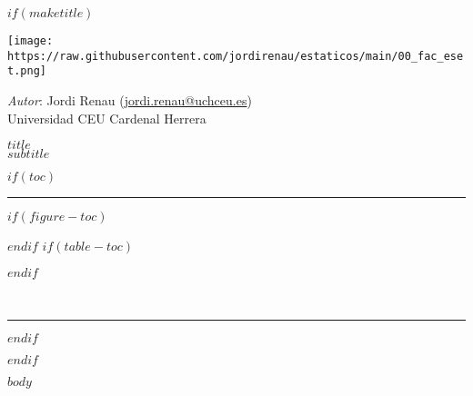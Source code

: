 \documentclass[11pt,a4paper,twoside,onecolumn,notitlepage,final]{scrartcl}
\date{$date$}
\newcommand{\mititulo}{ $title$ }
\newcommand{\misubtitulo}{ $subtitle$ }
\begin{document}
	\renewcommand{\tablename}{Tabla}
	
	$if(maketitle)$
	\begin{titlepage}
		
		\begin{minipage}[c]{0.29\textwidth}
	\texttt{[image: https://raw.githubusercontent.com/jordirenau/estaticos/main/00\_fac\_eset.png]}
	\end{minipage}
	\begin{minipage}[r]{0.7\textwidth}
		\begin{flushright}
			\large
			\textit{Autor}: Jordi Renau (\href{mailto:jordi.renau@uchceu.es}{jordi.renau@uchceu.es}) \\
			Universidad CEU Cardenal Herrera %
		\end{flushright}
		
	\end{minipage}
	
	\begin{flushright}
		\Huge 
		\mititulo \\[0.5cm]
		\huge
		\misubtitulo \\[1.5cm]
	\end{flushright}
	$if(toc)$
	\hrule
	\renewcommand{\contentsname}{Contenidos \small (\textit{Actualizado}: \today)}
	
	\tableofcontents 
	$if(figure-toc)$
	\renewcommand{\listfigurename}{Lista de figuras}
	\listoffigures
	$endif$
	$if(table-toc)$
	\renewcommand{\listtablename}{Lista de tablas}
	\listoftables
	$endif$
	
	~
	
	\hrule
	$endif$
\end{titlepage}
$endif$


$body$
\end{document}
